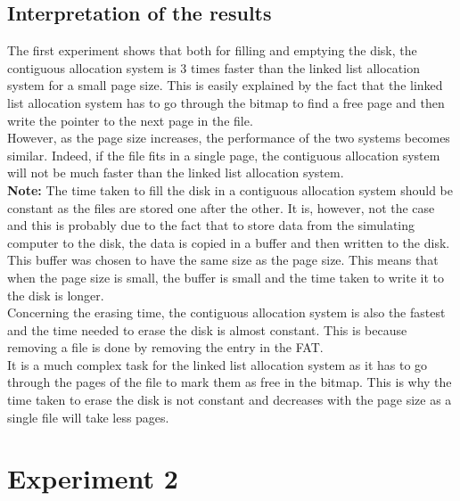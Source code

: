\documentclass[10pt,a4paper]{ULBreport}
\begin{document}
\subsection{Interpretation of the results}
The first experiment shows that both for filling and emptying the disk, the contiguous allocation system is 3 times faster than the linked list allocation system for a small page size. This is easily explained by the fact that the linked list allocation system has to go through the bitmap to find a free page and then write the pointer to the next page in the file. \\
However, as the page size increases, the performance of the two systems becomes similar. Indeed, if the file fits in a single page, the contiguous allocation system will not be much faster than the linked list allocation system. \\
\textbf{Note: } The time taken to fill the disk in a contiguous allocation system should be constant as the files are stored one after the other. It is, however, not the case and this is probably due to the fact that to store data from the simulating computer to the disk, the data is copied in a buffer and then written to the disk. This buffer was chosen to have the same size as the page size. This means that when the page size is small, the buffer is small and the time taken to write it to the disk is longer. \\
Concerning the erasing time, the contiguous allocation system is also the fastest and the time needed to erase the disk is almost constant. This is because removing a file is done by removing the entry in the FAT. \\
It is a much complex task for the linked list allocation system as it has to go through the pages of the file to mark them as free in the bitmap. This is why the time taken to erase the disk is not constant and decreases with the page size as a single file will take less pages. \\
\section{Experiment 2}
\end{document}
